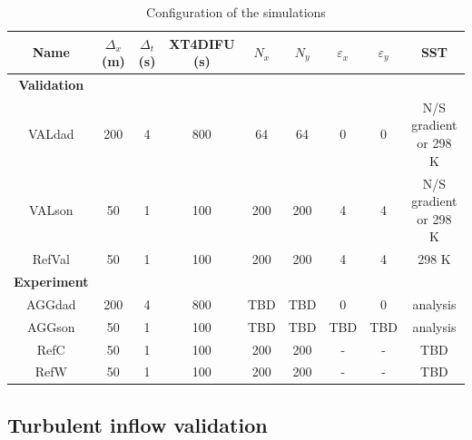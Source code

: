 \documentclass[draft]{agujournal2019} %
\begin{document}
            \begin{table}[h]
                \caption{Configuration of the simulations}
				\centering
				\begin{tabular}{ccccccccc}
					\hline
                    Name & $\Delta_{x}$ (m) & $\Delta_t$ (s) & XT4DIFU (s) & $N_x$ & $N_y$ & $\varepsilon_x$ & $\varepsilon_y$ & SST\\
                    \hline
                    \textbf{Validation} \\
					VALdad & 200   & 4 & 800 & 64 & 64 & 0 & 0 & N/S gradient or 298 K\\
					VALson & 50    & 1 & 100  & 200 & 200 & 4 & 4 & N/S gradient or 298 K\\
                    RefVal & 50    & 1 & 100  & 200 & 200 & 4 & 4 & 298 K\\
                    \textbf{Experiment} \\
                    AGGdad & 200   & 4 & 800 & TBD & TBD & 0 & 0 & analysis\\
					AGGson & 50    & 1 & 100  & TBD & TBD & TBD & TBD & analysis\\
                    RefC & 50 & 1 & 100  & 200 & 200 & - & - & TBD\\
                    RefW & 50 & 1 & 100  & 200 & 200 & - & - & TBD\\
					\hline
				\end{tabular}
				\label{tab:setups}
			\end{table}

            
            
            \subsection{Turbulent inflow validation}
            \label{subsection_inflowvalid}
\end{document}

